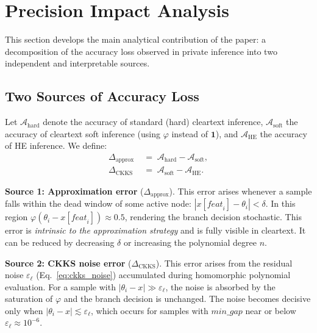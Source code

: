 \documentclass[runningheads]{llncs}
\begin{document}
\section{Precision Impact Analysis}
\label{sec:precision}

This section develops the main analytical contribution of the paper:
a decomposition of the accuracy loss observed in private inference into two
independent and interpretable sources.

\subsection{Two Sources of Accuracy Loss}
\label{sec:two_sources}

Let $\mathcal{A}_{\mathrm{hard}}$ denote the accuracy of standard (hard)
cleartext inference, $\mathcal{A}_{\mathrm{soft}}$ the accuracy of cleartext
soft inference (using $\varphi$ instead of $\mathbf{1}$), and
$\mathcal{A}_{\mathrm{HE}}$ the accuracy of HE inference.  We define:
\begin{align}
  \Delta_{\mathrm{approx}} &\;=\; \mathcal{A}_{\mathrm{hard}}
                                  - \mathcal{A}_{\mathrm{soft}}, \label{eq:delta_approx} \\
  \Delta_{\mathrm{CKKS}}   &\;=\; \mathcal{A}_{\mathrm{soft}}
                                  - \mathcal{A}_{\mathrm{HE}}.   \label{eq:delta_ckks}
\end{align}

\textbf{Source 1: Approximation error} ($\Delta_{\mathrm{approx}}$).
This error arises whenever a sample falls within the dead window of some
active node: $|x[\mathit{feat}_i] - \theta_i| < \delta$.  In this region
$\varphi(\theta_i - x[\mathit{feat}_i]) \approx 0.5$, rendering the branch
decision stochastic.  This error is \emph{intrinsic to the approximation
strategy} and is fully visible in cleartext.  It can be reduced by
decreasing $\delta$ or increasing the polynomial degree $n$.

\textbf{Source 2: CKKS noise error} ($\Delta_{\mathrm{CKKS}}$).
This error arises from the residual noise $\varepsilon_\ell$
(Eq.~\eqref{eq:ckks_noise}) accumulated during homomorphic polynomial
evaluation.  For a sample with $|\theta_i - x| \gg \varepsilon_\ell$,
the noise is absorbed by the saturation of $\varphi$ and the branch
decision is unchanged.  The noise becomes decisive only when
$|\theta_i - x| \lesssim \varepsilon_\ell$, which occurs for samples with
$\mathit{min\_gap}$ near or below $\varepsilon_\ell \approx 10^{-6}$.
\end{document}
